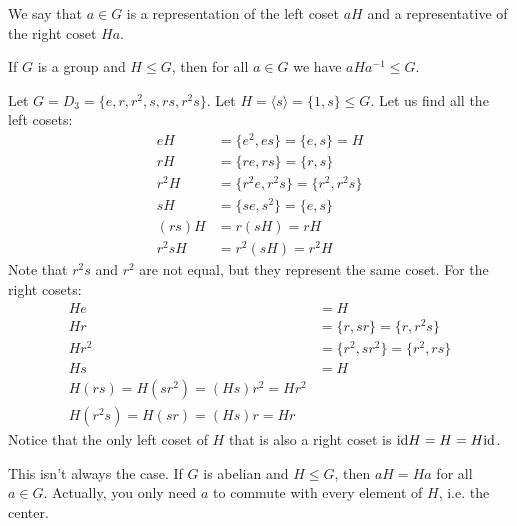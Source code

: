 \begin{itemize}
\begin{definition}
        We say that $a\in G$ is a representation of the left coset $aH$ and a representative of the right coset $Ha$.
    \end{definition}
    \begin{proposition}
        If $G$ is a group and $H \le G$, then for all $a\in G$ we have $aHa^{-1} \le G$.
    \end{proposition}
    \begin{example}
        Let $G = D_3 = \{e, r,r^2,s,rs,r^2s\}$. Let $H = \langle s\rangle = \{1,s\} \le G$. Let us find all the left cosets:
        \begin{align}
            eH &= \{e^2, es\} = \{e,s\} = H \\ 
            rH &= \{re,rs\} = \{r,s\} \\ 
            r^2H &= \{r^2e,r^2s\} = \{r^2,r^2s\} \\ 
            sH &= \{se,s^2\} = \{e,s\} \\ 
            (rs)H &= r(sH) = rH \\ 
            r^2sH &= r^2(sH) = r^2H
        \end{align}
        Note that $r^2s$ and $r^2$ are not equal, but they represent the same coset. For the right cosets:
        \begin{align}
            He &= H \\
            Hr &= \{r,sr\} = \{r,r^2s\}\\ 
            Hr^2 &= \{r^2,sr^2\} = \{r^2,rs\} \\ 
            Hs &= H \\ 
            H(rs)=H(sr^2)=(Hs)r^2 = Hr^2 \\ 
            H(r^2s)=H(sr)=(Hs)r=Hr
        \end{align}
        Notice that the only left coset of $H$ that is also a right coset is $\text{id} H = H = H\text{id}$.
        \vspace{2mm}

        This isn't always the case. If $G$ is abelian and $H\le G$, then $aH=Ha$ for all $a\in G$. Actually, you only need $a$ to commute with every element of $H$, i.e. the center.
    \end{example}
\end{itemize}